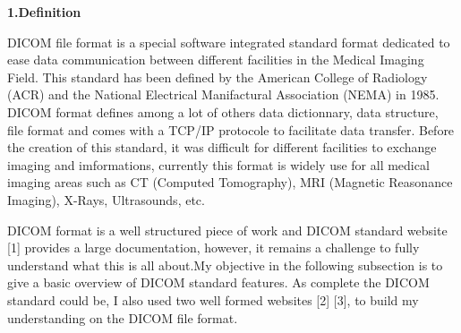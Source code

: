 \textbf{1.Definition}

\newline \vspace{5mm}
DICOM file format is a special software integrated standard format dedicated to ease
data communication between different facilities in the Medical Imaging Field. This standard has been defined by the American College of Radiology (ACR) and the National Electrical Manifactural Association (NEMA) in 1985. DICOM format defines among a lot of others data dictionnary, data structure, file format and comes with a TCP/IP protocole to facilitate data transfer. Before the creation of this standard, it was difficult for different facilities to exchange imaging and imformations, currently this format is widely use for all medical imaging areas such as CT (Computed Tomography), MRI (Magnetic Reasonance Imaging), X-Rays, Ultrasounds, etc. 

\newline \vspace{5mm}
DICOM format is a well structured piece of work and DICOM standard website [1] provides a large documentation, however, it remains a challenge to fully understand what this is all about.My objective in the following subsection is to give a basic overview of DICOM standard features. As complete the DICOM standard could be, I also used two well formed websites [2] [3], to build my understanding on the DICOM file format. 

\newline \vspace{5mm}



